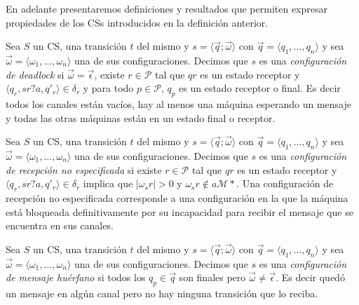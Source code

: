 En adelante presentaremos definiciones y resultados que permiten expresar propiedades de los CSs introducidos en la definición anterior.

\begin{definition}[Deadlock]Sea $S$ un CS, una transición $t$ del mismo y $s= \langle \overrightarrow{q} ; \overrightarrow{\omega} \rangle$ con $\overrightarrow{q}= \langle q_1, \ldots, q_n \rangle$ y sea $\overrightarrow{\omega}= \langle \omega_1, \ldots, \omega_n \rangle$ una de sus configuraciones. Decimos que $s$ es una \textit{configuración de deadlock} si $\overrightarrow{\omega} = \overrightarrow{\epsilon}$, existe $r \in \mathcal{P}$ tal que $qr$ es un estado receptor y $\langle q_r,sr?a,q'_r \rangle \in \delta_r$ y para todo $p \in \mathcal{P}$, $q_p$ es un estado receptor o final. Es decir todos los canales están vacíos, hay al menos una máquina esperando un mensaje y todas las otras máquinas están en un estado final o receptor.
\end{definition}

\begin{definition}Sea $S$ un CS, una transición $t$ del mismo y $s= \langle \overrightarrow{q} ; \overrightarrow{\omega} \rangle$ con $\overrightarrow{q}= \langle q_1, \ldots, q_n \rangle$ y sea $\overrightarrow{\omega}= \langle \omega_1, \ldots, \omega_n \rangle$ una de sus configuraciones. Decimos que $s$ es una \textit{configuración de recepción no especificada} si existe $r \in \mathcal{P}$ tal que $qr$ es un estado receptor y $\langle q_r,sr?a,q'_r \rangle \in \delta_r$ implica que $|\omega_sr| > 0$ y $\omega_sr \notin a\mathcal{M}*$. Una configuración de recepción no especificada corresponde a una configuración en la que la máquina está bloqueada definitivamente por su incapacidad para recibir el mensaje que se encuentra en sus canales.
\end{definition}

\begin{definition} Sea $S$ un CS, una transición $t$ del mismo y $s= \langle \overrightarrow{q} ; \overrightarrow{\omega} \rangle$ con $\overrightarrow{q}= \langle q_1, \ldots, q_n \rangle$ y sea $\overrightarrow{\omega}= \langle \omega_1, \ldots, \omega_n \rangle$ una de sus configuraciones. Decimos que $s$ es una \textit{configuración de mensaje huérfano} si todos los $q_p \in \overrightarrow{q}$ son finales pero $\overrightarrow{\omega} \neq \overrightarrow{\epsilon}$. Es decir quedó un mensaje en algún canal pero no hay ninguna transición que lo reciba.
\end{definition}

